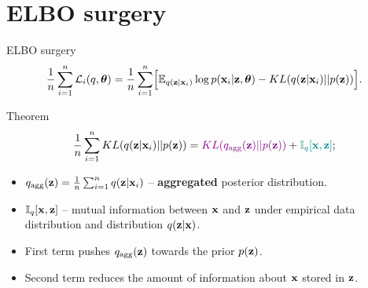 \section{ELBO surgery}
\begin{frame}{ELBO surgery}
	\vspace{-0.3cm}
	\[
	    \frac{1}{n} \sum_{i=1}^n \mathcal{L}_i(q, \boldsymbol{\theta}) = \frac{1}{n} \sum_{i=1}^n \Bigl[ \mathbb{E}_{q(\mathbf{z} | \mathbf{x}_i)} \log p(\mathbf{x}_i | \mathbf{z}, \boldsymbol{\theta}) - KL(q(\mathbf{z} | \mathbf{x}_i) || p(\mathbf{z})) \Bigr].
	\]
	\vspace{-0.3cm}
	\begin{block}{Theorem}
		\[
		    \frac{1}{n} \sum_{i=1}^n KL(q(\mathbf{z} | \mathbf{x}_i) || p(\mathbf{z})) = {\color{violet} KL(q_{\text{agg}}(\mathbf{z}) || p(\mathbf{z}))} + {\color{teal}\mathbb{I}_{q} [\mathbf{x}, \mathbf{z}]};
		\]
		\begin{itemize}
			\item $q_{\text{agg}}(\mathbf{z}) = \frac{1}{n} \sum_{i=1}^n q(\mathbf{z} | \mathbf{x}_i)$ -- \textbf{aggregated} posterior distribution.
			\item $\mathbb{I}_{q} [\mathbf{x}, \mathbf{z}]$ -- mutual information between $\mathbf{x}$ and $\mathbf{z}$ under empirical data distribution and distribution $q(\mathbf{z} | \mathbf{x})$.
			\item  {\color{violet} First term} pushes $q_{\text{agg}}(\mathbf{z})$ towards the prior $p(\mathbf{z})$.
			\item {\color{teal}Second term} reduces the amount of	information about $\mathbf{x}$ stored in $\mathbf{z}$. 
		\end{itemize}
	\end{block}
\end{frame}
